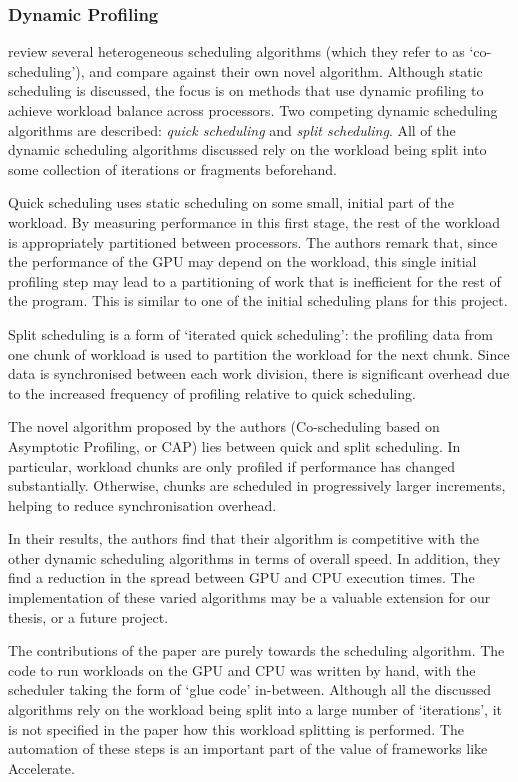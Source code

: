 \documentclass[a4paper,12pt]{article}
\begin{document}
\subsubsection*{Dynamic Profiling}
\citet*{wang_cpu+gpu_2014} review several heterogeneous scheduling algorithms (which they refer to as `co-scheduling'), and compare against their own novel algorithm.
Although static scheduling is discussed, the focus is on methods that use dynamic profiling to achieve workload balance across processors.
Two competing dynamic scheduling algorithms are described: \textit{quick scheduling} and \textit{split scheduling}.
All of the dynamic scheduling algorithms discussed rely on the workload being split into some collection of iterations or fragments beforehand.

Quick scheduling uses static scheduling on some small, initial part of the workload.
By measuring performance in this first stage, the rest of the workload is appropriately partitioned between processors.
The authors remark that, since the performance of the GPU may depend on the workload, this single initial profiling step may lead to a partitioning of work that is inefficient for the rest of the program.
This is similar to one of the initial scheduling plans for this project.

Split scheduling is a form of `iterated quick scheduling': the profiling data from one chunk of workload is used to partition the workload for the next chunk.
Since data is synchronised between each work division, there is significant overhead due to the increased frequency of profiling relative to quick scheduling.

The novel algorithm proposed by the authors (Co-scheduling based on Asymptotic Profiling, or CAP) lies between quick and split scheduling.
In particular, workload chunks are only profiled if performance has changed substantially.
Otherwise, chunks are scheduled in progressively larger increments, helping to reduce synchronisation overhead.

In their results, the authors find that their algorithm is competitive with the other dynamic scheduling algorithms in terms of overall speed.
In addition, they find a reduction in the spread between GPU and CPU execution times.
The implementation of these varied algorithms may be a valuable extension for our thesis, or a future project.

The contributions of the paper are purely towards the scheduling algorithm.
The code to run workloads on the GPU and CPU was written by hand, with the scheduler taking the form of `glue code' in-between.
Although all the discussed algorithms rely on the workload being split into a large number of  `iterations', it is not specified in the paper how this workload splitting is performed.
The automation of these steps is an important part of the value of frameworks like Accelerate.
\end{document}

